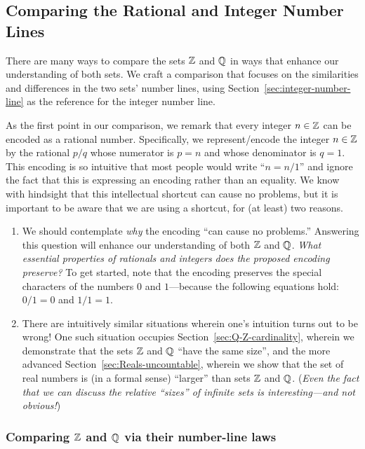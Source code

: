 \subsection{Comparing the Rational and Integer Number Lines}
\label{sec:Compare-Q-Z}

There are many ways to compare the sets $\mathbb{Z}$ and $\mathbb{Q}$ in ways that enhance our understanding of both sets.  We craft a comparison that focuses on the similarities and differences in the two sets' number lines, using Section~\ref{sec:integer-number-line} as the reference for the integer number line.

\smallskip

As the first point in our comparison, we remark that every integer $n \in \mathbb{Z}$ can be encoded as a rational number.  Specifically, we represent/encode the integer $n \in \mathbb{Z}$ by the rational $p/q$ whose numerator is $p = n$ and whose denominator is $q = 1$.  This encoding is so intuitive that most people would write ``$n = n/1$'' and ignore the fact that this is expressing an encoding
rather than an equality.  We know with hindsight that this intellectual shortcut can cause no problems, but it is important to be aware that we are using a shortcut, for (at least) two reasons.
\begin{enumerate}
\item
We should contemplate {\em why} the encoding ``can cause no problems.''  Answering this question will enhance our understanding of both $\mathbb{Z}$ and $\mathbb{Q}$.  {\em What essential properties of rationals and integers does the proposed encoding preserve?}  To get started, note that the encoding preserves the special characters of the numbers $0$ and $1$---because the following equations hold: $0/1 = 0$ and $1/1 = 1$.

\item
There are intuitively similar situations wherein one's intuition turns out to be wrong!  One such situation occupies Section~\ref{sec:Q-Z-cardinality}, wherein we demonstrate that the
sets $\mathbb{Z}$ and $\mathbb{Q}$ ``have the same size'', and the more advanced Section~\ref{sec:Reals-uncountable}, wherein we show that the set of real numbers is (in a formal sense) ``larger'' than sets $\mathbb{Z}$ and $\mathbb{Q}$.  ({\em Even the fact that we can discuss the relative ``sizes'' of infinite sets is interesting---and not obvious!})
\end{enumerate}

\subsubsection{Comparing $\mathbb{Z}$ and $\mathbb{Q}$ via their number-line laws}
\label{sec:Q-Z-laws}

